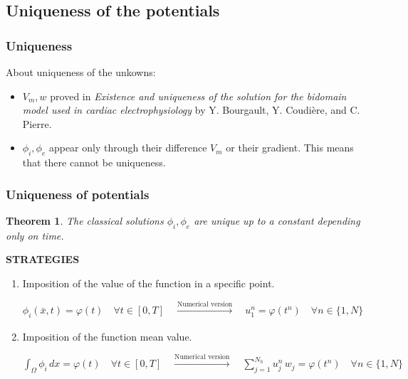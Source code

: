 \documentclass[9pt]{beamer}
\newtheorem*{theor}{Theorem}
\begin{document}
\begin{frame}
\section{Uniqueness of the potentials}
\frametitle{Uniqueness}
About uniqueness of the unkowns:
\vspace{2mm}
\begin{itemize}
\item $V_m, w$ proved in \textit{Existence and uniqueness of the solution for the bidomain model used in cardiac electrophysiology} by Y. Bourgault, Y. Coudière, and C. Pierre.
\vspace{2mm}
\item $\phi_i, \phi_e$ appear only through their difference $V_m$ or their gradient. This means that there cannot be uniqueness.
\end{itemize}
\end{frame}
\begin{frame}
\frametitle{Uniqueness of potentials}
\begin{theor}
The classical solutions $\phi_i,\phi_e$ are unique up to a constant depending only on time.
\end{theor}
\begin{center}
	\textbf{STRATEGIES}
\end{center}
\begin{enumerate}
\item Imposition of the value of the function in a specific point. \\
\begin{small}
	$\phi_i(\bar{x},t) = \varphi(t) \quad \forall t \in [0,T] \quad
	\xrightarrow[]{\text{Numerical version}}\quad
	u_1^n = \varphi(t^n) \quad \forall n \in \{1,N\}$ \vspace{4mm}
\end{small}
\item Imposition of the function mean value. \\
\begin{small}
$\displaystyle \int_\Omega \phi_i\,dx = \varphi(t) \quad \forall t \in [0,T] \quad
\xrightarrow[]{\text{Numerical version}}\quad \sum_{j=1}^{N_h} u_j^n \, w_j = \varphi(t^n)\quad \forall n \in \{1,N\}$
\end{small}
\end{enumerate}
\end{frame}
\end{document}
